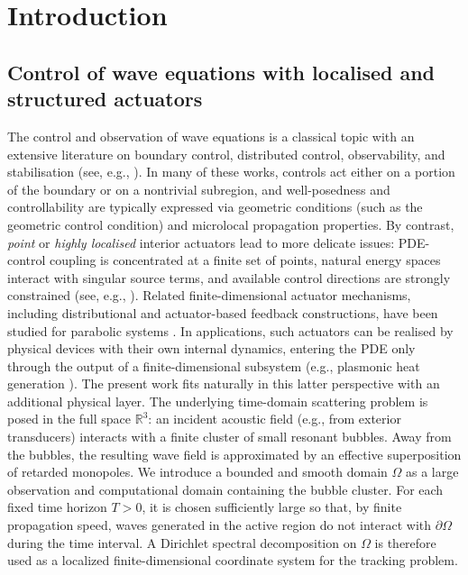 \documentclass[11pt,a4paper]{article}
\numberwithin{equation}{section}
\newcommand{\R}{\mathbb{R}}
\begin{document}
\section{Introduction}
\label{sec:intro}

\subsection{Control of wave equations with localised and structured actuators}
\noindent
The control and observation of wave equations is a classical topic with an extensive literature on boundary control, distributed control, observability, and stabilisation (see, e.g., \cite{BardosLebeauRauch, LionsBook,MillerSurvey, TucsnakWeissBook, ZuazuaReview}). In many of these works, controls act either on a portion of the boundary or on a nontrivial subregion, and well-posedness and controllability are typically expressed via geometric conditions (such as the geometric control condition) and microlocal propagation properties.
\newline
By contrast, \emph{point} or \emph{highly localised} interior actuators lead to more delicate issues: PDE-control coupling is concentrated at a finite set of points, natural energy spaces interact with singular source terms, and available control directions are strongly constrained (see, e.g., \cite{TucsnakWeissBook, TucsnakWeiss2015}). Related finite-dimensional actuator mechanisms, including distributional and actuator-based feedback constructions, have been studied for parabolic systems \cite{KunischRodriguesWalter,RodriguesSiniHeat}. In applications, such actuators can be realised by physical devices with their own internal dynamics, entering the PDE only through the output of a finite-dimensional subsystem (e.g., plasmonic heat generation \cite{RodriguesSiniHeat}).
\newline
The present work fits naturally in this latter perspective with an additional physical layer. The underlying time-domain scattering problem is posed in the full space $\R^3$: an incident acoustic field (e.g., from exterior transducers) interacts with a finite cluster of small resonant bubbles. Away from the bubbles, the resulting wave field is approximated by an effective superposition of retarded monopoles. We introduce a bounded and smooth domain $\Omega$ as a large observation and computational domain containing the bubble cluster. For each fixed time horizon $T>0$, it is chosen sufficiently large so that, by finite propagation speed, waves generated in the active region do not interact with $\partial\Omega$ during the time interval. A Dirichlet spectral decomposition on $\Omega$ is therefore used as a localized finite-dimensional coordinate system for the tracking problem.
\end{document}
